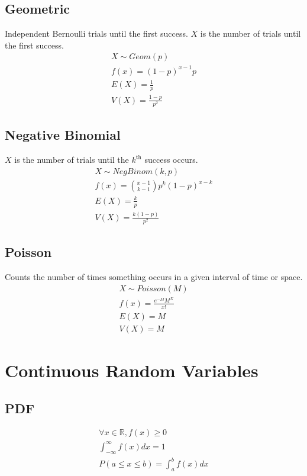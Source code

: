 \subsection{Geometric}
Independent Bernoulli trials until the first success. $X$ is the number of trials until the first success.
\begin{align}
  X \sim Geom(p) \\
  f(x) = (1 - p)^{x - 1}p \\
  E(X) = \frac{1}{p} \\
  V(X) = \frac{1 - p}{p^2}
\end{align}

\subsection{Negative Binomial}
$X$ is the number of trials until the $k^{\text{th}}$ success occurs.
\begin{align}
  X \sim NegBinom(k, p) \\
  f(x) = \binom{x - 1}{k - 1}p^k(1 - p)^{x-k} \\
  E(X) = \frac{k}{p} \\
  V(X) = \frac{k(1 - p)}{p^2}
\end{align}

\subsection{Poisson}
Counts the number of times something occurs in a given interval of time or space.
\begin{align}
  X \sim Poisson(M) \\
  f(x) = \frac{e^{-M}M^X}{x!} \\
  E(X) = M \\
  V(X) = M
\end{align}

\section{Continuous Random Variables}

\subsection{PDF}
\begin{align}
  \forall x \in \mathbb{R}, f(x) \geq 0 \\
  \int_{-\infty}^{\infty} f(x) dx = 1 \\
  P(a \leq x \leq b) = \int_{a}^{b} f(x) dx
\end{align}

